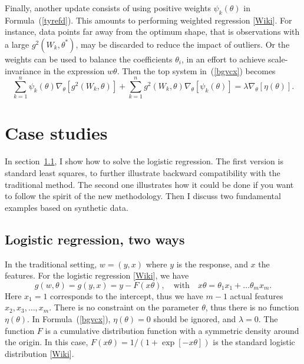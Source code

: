 \documentclass[oneside,10pt]{book}
\begin{document}
Finally, another update consists of using positive weights $\psi_k(\theta)$ in Formula~(\ref{tyrefd}). This amounts to performing
 \textcolor{index}{weighted regression} [\href{https://en.wikipedia.org/wiki/Generalized_least_squares#Weighted_least_squares}{Wiki}].
 For instance, data points far away from the optimum shape, that is observations with a large $g^2(W_k,\theta^*)$, may be discarded to reduce the
 impact of outliers. Or the weights can be used to balance the coefficients $\theta_i$, in an effort to achieve scale-invariance in the expression
 $w\theta$.  Then the top system in~(\ref{bgvcx}) becomes
\begin{equation}
 \sum_{k=1}^n \psi_k(\theta)\nabla_\theta [g^2(W_k,\theta)] +\sum_{k=1}^n g^2(W_k,\theta)\nabla_\theta[\psi_k(\theta)]  =\lambda \nabla_\theta [\eta(\theta)].  \label{bgvcx2_1228}
\end{equation}



\section{Case studies}

In section~\ref{2ways}, I show how to solve the logistic regression. The first version is standard least squares, to further illustrate
backward compatibility with the traditional method. The second one illustrates how it could be done if you want to follow the spirit of the new methodology.  Then I discuss two fundamental examples based on synthetic data.

\subsection{Logistic regression, two ways}\label{2ways}

In the traditional setting, $w=(y,x)$ where $y$ is the response, and $x$ the features. For the
\textcolor{index}{logistic regression}
 [\href{https://en.wikipedia.org/wiki/Logistic_regression}{Wiki}],
we have
$$
g(w,\theta)=g(y,x)= y-F(x\theta), \quad \text{with } \text{ } x\theta=\theta_1 x_1 + \dots \theta_m x_m.
$$
Here $x_1=1$ corresponds to the intercept, thus we have $m-1$ actual features $x_2,x_3,\dots,x_m$. There is no constraint on the parameter $\theta$,
 thus there is no function $\eta(\theta)$. In Formula~(\ref{bgvcx}), $\eta(\theta)=0$ should be ignored, and $\lambda=0$. The function $F$ is
 a cumulative distribution function with a symmetric density around the origin. In this case, $F(x\theta)=1/(1+\exp[-x\theta])$ is the
  standard \textcolor{index}{logistic distribution} [\href{https://en.wikipedia.org/wiki/Logistic_distribution}{Wiki}].
\end{document}
